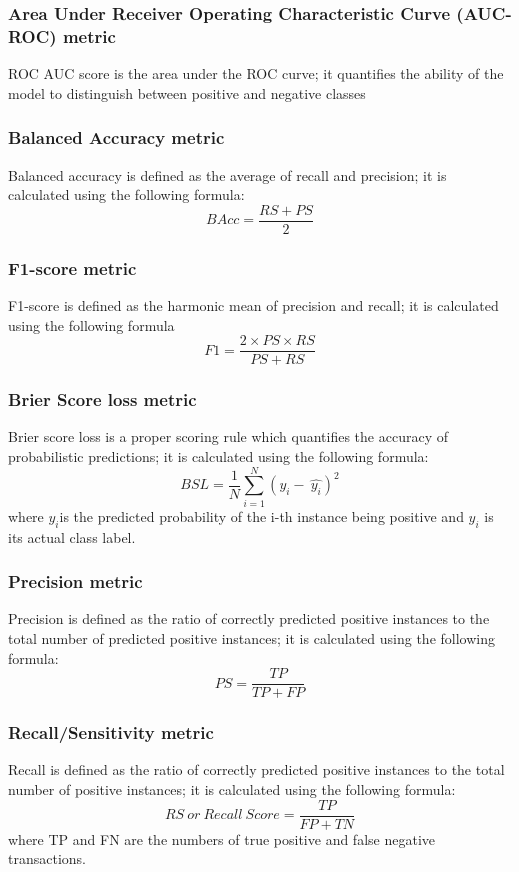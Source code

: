 \documentclass[preprint,12pt]{elsarticle}
\begin{document}
\subsubsection{Area Under Receiver Operating Characteristic Curve (AUC-ROC) metric}
\label{sec3_5_2}
ROC AUC score is the area under the ROC curve; it quantifies the ability of the model to distinguish between positive and negative classes

\subsubsection{Balanced Accuracy metric}
\label{sec3_5_3}
Balanced accuracy is defined as the average of recall and precision; it is calculated using the following formula:
$$BAcc=\frac{RS+PS}{2}$$

\subsubsection{F1-score  metric}
\label{sec3_5_4}
F1-score is defined as the harmonic mean of precision and recall; it is calculated using the following formula
$$F1=\frac{2\times P S\times R S}{PS+RS}$$

\subsubsection{Brier Score loss metric}
\label{sec3_5_5}
Brier score loss is a proper scoring rule which quantifies the accuracy of probabilistic predictions; it is calculated using the following formula:
$$BSL=\frac{1}{N}\sum_{i=1}^{N}\left(y_i-\ \widehat{y_i}\right)^2$$
where $\widehat{y_i}$is the predicted probability of the i-th instance being positive and $y_i$ is its actual class label.


\subsubsection{Precision metric}
\label{sec3_5_6}
Precision is defined as the ratio of correctly predicted positive instances to the total number of predicted positive instances; it is calculated using the following formula:
$$PS=\frac{TP}{TP+FP}$$


\subsubsection{Recall/Sensitivity  metric}
\label{sec3_5_7}
Recall is defined as the ratio of correctly predicted positive instances
to the total number of positive instances; it is calculated using the following formula:
$$RS\ or\ Recall\ Score=\frac{TP}{FP+TN}$$
where TP and FN are the numbers of true positive and false negative transactions.
\end{document}
